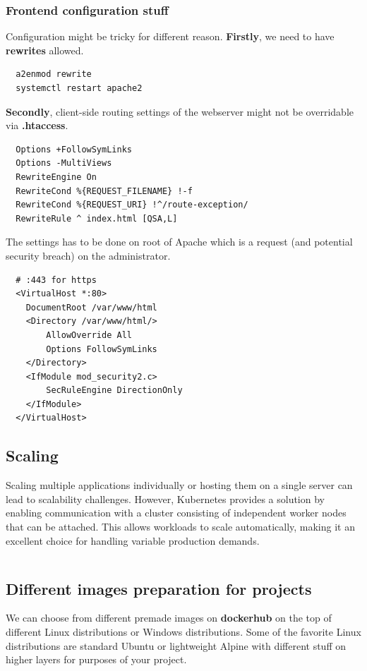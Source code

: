 \documentclass{article}
\begin{document}
\subsubsection{Frontend configuration stuff}
Configuration might be tricky for different reason. \textbf{Firstly}, we need to have \textbf{rewrites} allowed.
\begin{lstlisting}
  a2enmod rewrite
  systemctl restart apache2
\end{lstlisting}
\textbf{Secondly}, client-side routing settings of the webserver might not be overridable via \textbf{.htaccess}.  
\begin{lstlisting}
  Options +FollowSymLinks
  Options -MultiViews
  RewriteEngine On
  RewriteCond %{REQUEST_FILENAME} !-f
  RewriteCond %{REQUEST_URI} !^/route-exception/
  RewriteRule ^ index.html [QSA,L]
\end{lstlisting}
The settings has to be done on root of Apache which is a request (and potential security breach) on the administrator.
\begin{lstlisting}
  # :443 for https
  <VirtualHost *:80>
    DocumentRoot /var/www/html
    <Directory /var/www/html/>
        AllowOverride All
        Options FollowSymLinks
    </Directory>
    <IfModule mod_security2.c>
        SecRuleEngine DirectionOnly
    </IfModule>
  </VirtualHost>	
\end{lstlisting}
\subsection{Scaling}
Scaling multiple applications individually or hosting them on a single server can lead to scalability challenges. However, Kubernetes provides a solution by enabling communication with a cluster consisting of independent worker nodes that can be attached. This allows workloads to scale automatically, making it an excellent choice for handling variable production demands. 
\begin{lstlisting}

\end{lstlisting}
\subsection{Different images preparation for projects}
We can choose from different premade images on \textbf{dockerhub} on the top of different Linux distributions or Windows distributions. Some of the favorite Linux distributions are standard Ubuntu or lightweight Alpine with different stuff on higher layers for purposes of your project.
\end{document}

